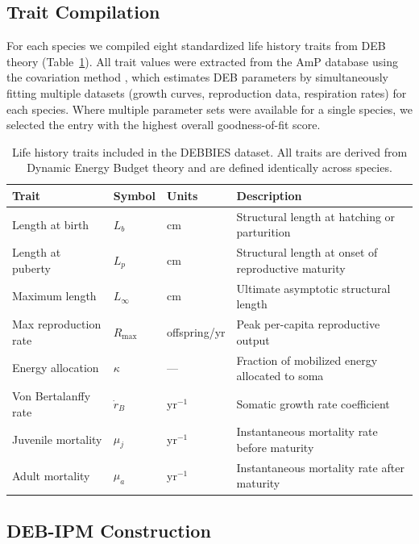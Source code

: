 \documentclass[11pt]{article}
\begin{document}
\subsection{Trait Compilation}

For each species we compiled eight standardized life history traits from DEB theory (Table~\ref{tab:traits}). All trait values were extracted from the AmP database using the covariation method \citep{lika2011}, which estimates DEB parameters by simultaneously fitting multiple datasets (growth curves, reproduction data, respiration rates) for each species. Where multiple parameter sets were available for a single species, we selected the entry with the highest overall goodness-of-fit score.

\begin{table}[t]
\centering
\caption{Life history traits included in the DEBBIES dataset. All traits are derived from Dynamic Energy Budget theory and are defined identically across species.}
\label{tab:traits}
\begin{tabular}{@{}llll@{}}
\toprule
Trait & Symbol & Units & Description \\
\midrule
Length at birth         & $L_b$         & cm               & Structural length at hatching or parturition \\
Length at puberty       & $L_p$         & cm               & Structural length at onset of reproductive maturity \\
Maximum length          & $L_\infty$    & cm               & Ultimate asymptotic structural length \\
Max reproduction rate   & $R_{\max}$    & offspring/yr     & Peak per-capita reproductive output \\
Energy allocation       & $\kappa$      & ---              & Fraction of mobilized energy allocated to soma \\
Von Bertalanffy rate    & $\dot{r}_B$   & yr$^{-1}$        & Somatic growth rate coefficient \\
Juvenile mortality      & $\mu_j$       & yr$^{-1}$        & Instantaneous mortality rate before maturity \\
Adult mortality         & $\mu_a$       & yr$^{-1}$        & Instantaneous mortality rate after maturity \\
\bottomrule
\end{tabular}
\end{table}

\subsection{DEB-IPM Construction}
\end{document}
